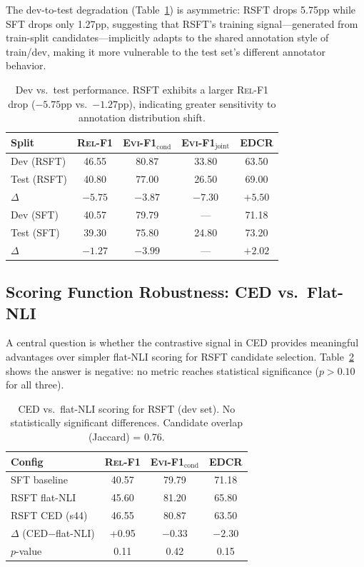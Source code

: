\documentclass[11pt,a4paper]{article}
\newcommand{\evi}{\textsc{Evi-F1}}
\newcommand{\edcr}{\textsc{EDCR}}
\newcommand{\relf}{\textsc{Rel-F1}}
\begin{document}
The dev-to-test degradation (Table~\ref{tab:devtest}) is asymmetric: RSFT drops 5.75pp while SFT drops only 1.27pp, suggesting that RSFT's training signal---generated from train-split candidates---implicitly adapts to the shared annotation style of train/dev, making it more vulnerable to the test set's different annotator behavior.

\begin{table}[t]
\centering
\small
\begin{tabular}{lcccc}
\toprule
\textbf{Split} & \textbf{\relf{}} & \textbf{\evi{}$_\text{cond}$} & \textbf{\evi{}$_\text{joint}$} & \textbf{\edcr{}} \\
\midrule
Dev (RSFT) & 46.55 & 80.87 & 33.80 & 63.50 \\
Test (RSFT) & 40.80 & 77.00 & 26.50 & 69.00 \\
$\Delta$ & $-5.75$ & $-3.87$ & $-7.30$ & $+5.50$ \\
\midrule
Dev (SFT) & 40.57 & 79.79 & --- & 71.18 \\
Test (SFT) & 39.30 & 75.80 & 24.80 & 73.20 \\
$\Delta$ & $-1.27$ & $-3.99$ & --- & $+2.02$ \\
\bottomrule
\end{tabular}
\caption{Dev vs.\ test performance. RSFT exhibits a larger \relf{} drop ($-5.75$pp vs.\ $-1.27$pp), indicating greater sensitivity to annotation distribution shift.}
\label{tab:devtest}
\end{table}

\subsection{Scoring Function Robustness: CED vs.\ Flat-NLI}
\label{sec:ced_vs_flatnli}

A central question is whether the contrastive signal in CED provides meaningful advantages over simpler flat-NLI scoring for RSFT candidate selection. Table~\ref{tab:ced_flatnli} shows the answer is negative: no metric reaches statistical significance ($p{>}0.10$ for all three).

\begin{table}[t]
\centering
\small
\begin{tabular}{lccc}
\toprule
\textbf{Config} & \textbf{\relf{}} & \textbf{\evi{}$_\text{cond}$} & \textbf{\edcr{}} \\
\midrule
SFT baseline & 40.57 & 79.79 & 71.18 \\
RSFT flat-NLI & 45.60 & 81.20 & 65.80 \\
RSFT CED (s44) & 46.55 & 80.87 & 63.50 \\
\midrule
$\Delta$ (CED$-$flat-NLI) & +0.95 & $-0.33$ & $-2.30$ \\
$p$-value & 0.11 & 0.42 & 0.15 \\
\bottomrule
\end{tabular}
\caption{CED vs.\ flat-NLI scoring for RSFT (dev set). No statistically significant differences. Candidate overlap (Jaccard) = 0.76.}
\label{tab:ced_flatnli}
\end{table}
\end{document}
